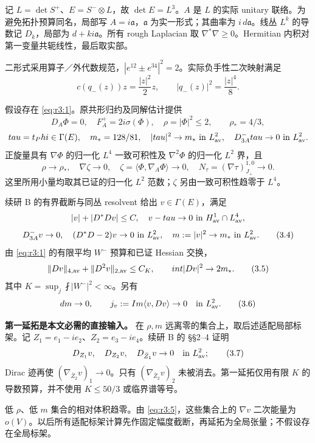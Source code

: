 \documentclass[UTF8,11pt,openany,oneside,fontset=none]{ctexbook}
\begin{document}
记 \(L=\det S^+\)、\(E=S^-\otimes L\)，故 \(\det E=L^3\)。\(A\) 是 \(L\) 的实际 unitary 联络。为避免拓扑预算同名，局部写 \(A=i\mathfrak a\)，\(\mathfrak a\) 为实一形式；其曲率为 \(i\,d\mathfrak a\)。线丛 \(L^k\) 的导数记 \(D_k\)，局部为 \(d+ki\mathfrak a\)。所有 rough Laplacian 取 \(\nabla^*\nabla\ge0\)。Hermitian 内积对第一变量共轭线性，最后取实部。

二形式采用算子／外代数规范，\(|e^{12}\pm e^{34}|^2=2\)。实际负手性二次映射满足 \[
 c(q_-(z))z=\frac{|z|^2}{2}z,\qquad |q_-(z)|^2=\frac{|z|^4}{8}.
\]

假设存在 \eqref{eq:r3:1}。原共形归约及同解估计提供 \[
 D_A\Phi=0,\quad F_A^+=2i\sigma(\Phi),\quad
 \rho=|\Phi|^2\le2,\qquad \rho_* =4/3,
\] \[
 \tau=t_\Phi\in\Gamma(E),\quad m_*=128/81,
 \quad |\tau|^2\to m_*\text{ in }L^2_{\rm av},
 \quad D^-_{3A}\tau\to0\text{ in }L^2_{\rm av}.
\] 正旋量具有 \(\nabla\Phi\) 的归一化 \(L^4\) 一致可积性及 \(\nabla^2\Phi\) 的归一化 \(L^2\) 界，且 \[
 \rho\to\rho_*,\quad \nabla\zeta\to0,\quad
 \zeta=\langle\Phi,\nabla_A\Phi\rangle\to0,
 \quad N_\tau=(\nabla\tau)^{1,0}_{J_+}\to0.
 \tag{3.3}\label{eq:r3:3}
\] 这里所用小量均取其已证的归一化 \(L^2\) 范数；\(\zeta\) 另由一致可积性趋零于 \(L^4\)。

续研 B 的有界截断与同丛 resolvent 给出 \(v\in\Gamma(E)\)，满足 \[
 |v|+|\nabla^*\nabla v|\le C,
 \quad v-\tau\to0\text{ in }H^1_{\rm av}\cap L^4_{\rm av},
\] \[
 D^-_{3A}v\to0,\quad
 (\nabla^*\nabla-2)v\to0\text{ in }L^2_{\rm av},\quad
 m:=|v|^2\to m_*\text{ in }L^2_{\rm av}.
 \tag{3.4}\label{eq:r3:4}
\] 由 \eqref{eq:r3:1} 的有限平均 \(W^-\) 预算和已证 Hessian 交换， \[
 \|\nabla v\|_{4,\rm av}+\|\nabla^2v\|_{2,\rm av}\le C_K,
 \qquad \fint|\nabla v|^2\to2m_*.
 \tag{3.5}\label{eq:r3:5}
\] 其中 \(K=\sup_j\fint |W^-|^2<\infty\)。另有 \[
 dm\to0,\qquad j_v:=\operatorname{Im}\langle v,\nabla v\rangle\to0
 \quad\text{in }L^2_{\rm av}.
 \tag{3.6}\label{eq:r3:6}
\]

\textbf{第一延拓是本文必需的直接输入。} 在 \(\rho,m\) 远离零的集合上，取后述适配局部标架。记 \(Z_1=e_1-ie_2\)、\(Z_2=e_3-ie_4\)。续研 B 的  §§2--4 证明 \[
 \nabla_{Z_1}v,\quad \nabla_{Z_2}v,\quad
 \nabla_{\bar Z_1}v\to0\quad\text{in }L^2_{\rm av};
 \tag{3.7}\label{eq:r3:7}
\] Dirac 迹再使 \((\nabla_{\bar Z_2}v)_1\to0\)。只有 \((\nabla_{\bar Z_2}v)_2\) 未被消去。第一延拓仅用有限 \(K\) 的导数预算，并不使用 \(K\le50/3\) 或临界谱等号。

低 \(\rho\)、低 \(m\) 集合的相对体积趋零。由 \eqref{eq:r3:5}，这些集合上的 \(\nabla v\) 二次能量为 \(o(V)\)。以后所有适配标架计算先作固定幅度截断，再延拓为全局张量；不假设存在全局标架。
\end{document}
